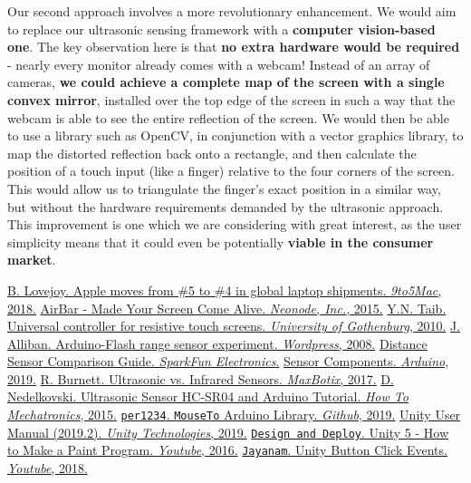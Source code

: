 \documentclass{article}
\begin{document}
Our second approach involves a more revolutionary enhancement. We would aim to replace our ultrasonic sensing framework with a \textbf{computer vision-based one}. The key observation here is that \textbf{no extra hardware would be required} - nearly every monitor already comes with a webcam! Instead of an array of cameras, \textbf{we could achieve a complete map of the screen with a single convex mirror}, installed over the top edge of the screen in such a way that the webcam is able to see the entire reflection of the screen. We would then be able to use a library such as OpenCV, in conjunction with a vector graphics library, to map the distorted reflection back onto a rectangle, and then calculate the position of a touch input (like a finger) relative to the four corners of the screen. This would allow us to triangulate the finger’s exact position in a similar way, but without the hardware requirements demanded by the ultrasonic approach. This improvement is one which we are considering with great interest, as the user simplicity means that it could even be potentially \textbf{viable in the consumer market}.

\begin{thebibliography}{1}
 \href{https://9to5mac.com/2018/02/12/apple-mac-market-share/}{B. Lovejoy. Apple moves from \#5 to \#4 in global laptop shipments. \textit{9to5Mac}, 2018.}
 \href{https://air.bar/}{AirBar - Made Your Screen Come Alive. \textit{Neonode, Inc.}, 2015.}
 \href{https://pdfs.semanticscholar.org/f8f6/e2ab7c2e2a1b520f5ffb0cfea894f93ce6d9.pdf}{Y.N. Taib. Universal controller for resistive touch screens. \textit{University of Gothenburg}, 2010.}
 \href{https://jamesalliban.wordpress.com/2008/06/06/arduino-flash-range-sensor-experiment/}{J. Alliban. Arduino-Flash range sensor experiment. \textit{Wordpress}, 2008.}
 \href{https://www.sparkfun.com/distance_sensor_comparison_guide}{Distance Sensor Comparison Guide. \textit{SparkFun Electronics}.}
 \href{https://store.arduino.cc/usa/components/components-sensors}{Sensor Components. \textit{Arduino}, 2019.}
 \href{https://www.maxbotix.com/articles/ultrasonic-or-infrared-sensors.htm}{R. Burnett. Ultrasonic vs. Infrared Sensors. \textit{MaxBotix}, 2017.}
 \href{https://howtomechatronics.com/tutorials/arduino/ultrasonic-sensor-hc-sr04/}{D. Nedelkovski. Ultrasonic Sensor HC-SR04 and Arduino Tutorial. \textit{How To Mechatronics}, 2015.}
 \href{https://github.com/per1234/MouseTo}{\texttt{per1234}. \texttt{MouseTo} Arduino Library. \textit{Github}, 2019.}
 \href{https://docs.unity3d.com/Manual/index.html}{Unity User Manual (2019.2). \textit{Unity Technologies}, 2019.}
\href{https://www.youtube.com/watch?v=jx5U1ZaZ080}{\texttt{Design and Deploy}. Unity 5 - How to Make a Paint Program. \textit{Youtube}, 2016.}
\href{https://www.youtube.com/watch?v=kdkrjCF0KCo}{\texttt{Jayanam}. Unity Button Click Events. \textit{Youtube}, 2018.}
\end{thebibliography}
\end{document}
